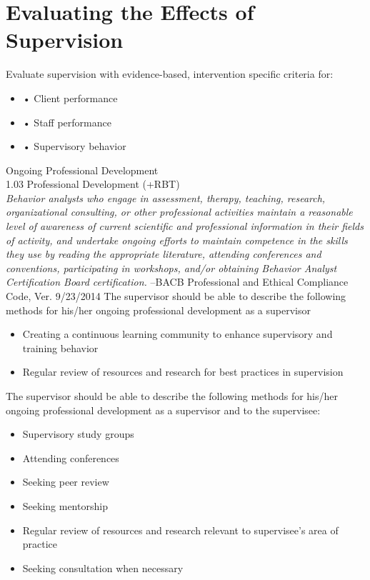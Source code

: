 \section{Evaluating the Effects of Supervision}
Evaluate supervision with evidence-based, intervention specific criteria for:
\begin{itemize}
\item    • Client performance
\item    • Staff performance
\item    • Supervisory behavior 
\end{itemize}
%
Ongoing Professional Development\\
1.03 Professional Development (+RBT)\\
\textit{Behavior analysts who engage in assessment, therapy, teaching, research, organizational consulting, or other professional activities maintain a reasonable level of awareness of current scientific and professional information in their fields of activity, and undertake ongoing efforts to maintain competence in the skills they use by reading the appropriate literature, attending conferences and conventions, participating in workshops, and/or obtaining Behavior Analyst Certification Board certification.}
--BACB Professional and Ethical Compliance Code, Ver. 9/23/2014
%
The supervisor should be able to describe the following methods for his/her ongoing professional development as a supervisor
\begin{itemize}
\item Creating a continuous learning community to enhance supervisory and training behavior
\item Regular review of resources and research for best practices in supervision
\end{itemize}
%
The supervisor should be able to describe the following methods for his/her ongoing professional development as a supervisor and to the supervisee:
\begin{itemize}
\item Supervisory study groups
\item Attending conferences
\item Seeking peer review
\item Seeking mentorship
\item Regular review of resources and research relevant to supervisee's area of practice
\item Seeking consultation when necessary
\end{itemize}
%
%
%
%
%
%
%
%
%
%
%
%
%
%
%
%
%
%
%
%
%
%
%
%
%
%
%
%
%
%
% 
%
